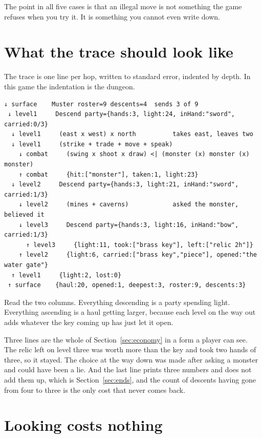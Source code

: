 \documentclass[11pt,a4paper]{article}
\begin{document}
The point in all five cases is that an illegal move is not something the game refuses when you
try it. It is something you cannot even write down.

\section{What the trace should look like}
\label{sec:trace}

The trace is one line per hop, written to standard error, indented by depth. In this game the
indentation is the dungeon.

\begin{lstlisting}[breaklines=false, basicstyle=\ttfamily\footnotesize]
 ↓ surface    Muster roster=9 descents=4  sends 3 of 9
 ↓ level1     Descend party={hands:3, light:24, inHand:"sword", carried:0/3}
  ↓ level1     (east x west) x north          takes east, leaves two
  ↓ level1     (strike + trade + move + speak)
    ↓ combat     (swing x shoot x draw) <| (monster (x) monster (x) monster)
    ↑ combat     {hit:["monster"], taken:1, light:23}
  ↓ level2     Descend party={hands:3, light:21, inHand:"sword", carried:1/3}
    ↓ level2     (mines + caverns)            asked the monster, believed it
    ↓ level3     Descend party={hands:3, light:16, inHand:"bow", carried:1/3}
      ↑ level3     {light:11, took:["brass key"], left:["relic 2h"]}
    ↑ level2     {light:6, carried:["brass key","piece"], opened:"the water gate"}
  ↑ level1     {light:2, lost:0}
 ↑ surface    {haul:20, opened:1, deepest:3, roster:9, descents:3}
\end{lstlisting}

Read the two columns. Everything descending is a party spending light. Everything ascending is a
haul getting larger, because each level on the way out adds whatever the key coming up has just
let it open.

Three lines are the whole of Section~\ref{sec:economy} in a form a player can see. The relic left
on level three was worth more than the key and took two hands of three, so it stayed. The choice
at the way down was made after asking a monster and could have been a lie. And the last line
prints three numbers and does not add them up, which is Section~\ref{sec:ends}, and the count of
descents having gone from four to three is the only cost that never comes back.

\section{Looking costs nothing}
\label{sec:looking}
\end{document}
